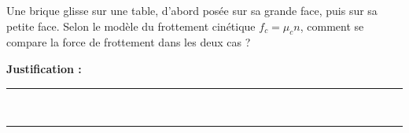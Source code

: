 Une brique glisse sur une table, d'abord posée sur sa grande face, puis sur sa petite face. Selon le modèle du frottement cinétique $f_c = \mu_c n$, comment se compare la force de frottement dans les deux cas ?

\choices

\noindent\textbf{Justification :} \hrulefill \\[2.5ex]
\rule{\linewidth}{0.4pt} \\[2.5ex]
\rule{\linewidth}{0.4pt}
\vfill
